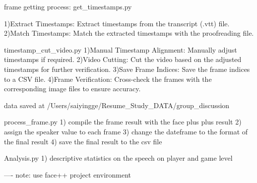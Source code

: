 

frame getting process:
get_timestamps.py

1)Extract Timestamps: Extract timestamps from the transcript (.vtt) file. 
2)Match Timestamps: Match the extracted timestamps with the proofreading file.

timestamp_cut_video.py
1)Manual Timestamp Alignment: Manually adjust timestamps if required.
2)Video Cutting: Cut the video based on the adjusted timestamps for further verification.
3)Save Frame Indices: Save the frame indices to a CSV file.
4)Frame Verification: Cross-check the frames with the corresponding image files to ensure accuracy.

data saved at /Users/saiyingge/Resume_Study_DATA/group_discussion

process_frame.py
1) compile the frame result with the face plus plus result
2) assign the speaker value to each frame
3) change the dateframe to the format of the final result
4) save the final result to the csv file

Analysis.py
1) descriptive statistics on the speech on player and game level


----
note:
use face++ project environment